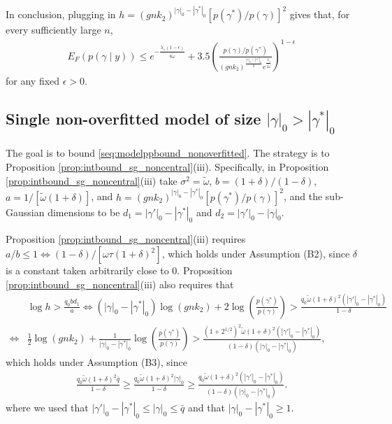 In conclusion, plugging  in $h=(g n k_2)^{|\gamma|_0 - |\gamma^*|_0} [ p(\gamma^*)/p(\gamma) ]^2$ gives that,
for every sufficiently large $n$,
\begin{align}
 E_F (p(\gamma \mid y)) \leq  
e^{ -\frac{\lambda_\gamma (1-\epsilon)}{8\tilde{\omega}}}
+ 3.5 \left( \frac{ p(\gamma)/p(\gamma^*) }{(gnk_2)^{\frac{|\gamma|_0 - |\gamma^*|_0}{2}} e^{\frac{\lambda_\gamma}{2 \tilde{\omega}}}} \right)^{1-\epsilon}
\label{seq:modelppbound_nonoverfitted4}
\end{align}
for any fixed $\epsilon>0$.



\subsection{Single non-overfitted model of size $|\gamma|_0 > |\gamma^*|_0$}

The goal is to bound \eqref{seq:modelppbound_nonoverfitted}. The strategy is to Proposition \ref{prop:intbound_sg_noncentral}(iii).
Specifically, in Proposition \ref{prop:intbound_sg_noncentral}(iii) take 
$\sigma^2= \tilde{\omega}$, $b=(1+\delta)/(1-\delta)$, $a= 1/[\tilde{\omega} (1+\delta)]$,
and $h=(g n k_2)^{|\gamma|_0 - |\gamma^*|_0} [ p(\gamma^*)/p(\gamma) ]^2$, and the sub-Gaussian dimensions to be
$d_1=|\gamma'|_0 - |\gamma^*|_0$ and $d_2=|\gamma'|_0 - |\gamma|_0$.

Proposition \ref{prop:intbound_sg_noncentral}(iii) requires $a/b \leq 1 \Leftrightarrow (1-\delta)/[\omega \tau (1+\delta)^2]$, which holds under Assumption (B2), since $\delta$ is a constant taken arbitrarily close to 0.
Proposition \ref{prop:intbound_sg_noncentral}(iii) also requires that
\begin{align}
& \log h > \frac{q_0 b d_1}{a} \Leftrightarrow
(|\gamma|_0 - |\gamma^*|_0) \log(g n k_2) + 2 \log \left( \frac{p(\gamma^*)}{p(\gamma)} \right) 
 > \frac{q_0 \tilde{\omega} (1+\delta)^2 (|\gamma'|_0-|\gamma^*|_0)}{1-\delta}
\nonumber \\
\Leftrightarrow
&\frac{1}{2}\log(g n k_2) + \frac{1}{|\gamma|_0 - |\gamma^*|_0} \log \left( \frac{p(\gamma^*)}{p(\gamma)} \right) 
 > \frac{(1+2^{1/2})^2 \tilde{\omega} (1+\delta)^2 (|\gamma'|_0-|\gamma^*|_0)}{(1-\delta) (|\gamma|_0 - |\gamma^*|_0)},
\end{align}
which holds under Assumption (B3), since 
\begin{align}
 \frac{q_0 \tilde{\omega} (1+\delta)^2 \bar{q}}{1-\delta}
\geq \frac{q_0 \tilde{\omega} (1+\delta)^2 |\gamma|_0}{1-\delta}
\geq \frac{q_0 \tilde{\omega} (1+\delta)^2 (|\gamma'|_0-|\gamma^*|_0)}{(1-\delta)(|\gamma|_0 - |\gamma^*|_0)}.
\nonumber
\end{align}
where we used that $|\gamma'|_0 - |\gamma^*|_0 \leq |\gamma|_0 \leq \bar{q}$ and that $|\gamma|_0 - |\gamma^*|_0 \geq 1$.

